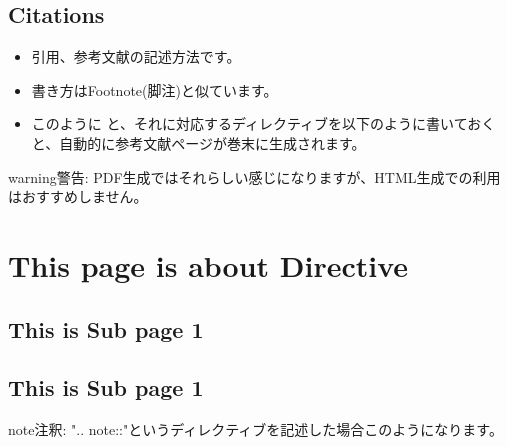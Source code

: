 \documentclass[letterpaper,10pt,dvipdfmx,openany,oneside]{sphinxmanual}
\begin{document}
\section{Citations}
\label{\detokenize{1.chapter/basic_syntax:citations}}\begin{itemize}
\item {} 
引用、参考文献の記述方法です。

\item {} 
書き方はFootnote(脚注)と似ています。

\item {} 
このように \label{\detokenize{1.chapter/basic_syntax:id5}}{\hyperref[\detokenize{1.chapter/basic_syntax:abc}]{\sphinxcrossref{{[}参考文献名ABC{]}}}} と、それに対応するディレクティブを以下のように書いておくと、自動的に参考文献ページが巻末に生成されます。

\end{itemize}

%
\begin{sphinxVerbatim}[commandchars=\\\{\}]
 \PYG{p}{[}\PYG{p}{]}   
\end{sphinxVerbatim}

\begin{sphinxadmonition}{warning}{警告:}
PDF生成ではそれらしい感じになりますが、HTML生成での利用はおすすめしません。
\end{sphinxadmonition}


\chapter{This page is about Directive}
\label{\detokenize{2.chapter/directive::doc}}\label{\detokenize{2.chapter/directive:this-page-is-about-directive}}

\section{This is Sub page 1}
\label{\detokenize{2.chapter/subpage/sub1:this-is-sub-page-1}}\label{\detokenize{2.chapter/subpage/sub1::doc}}

\section{This is Sub page 1}
\label{\detokenize{2.chapter/subpage/sub2:this-is-sub-page-1}}\label{\detokenize{2.chapter/subpage/sub2::doc}}
\begin{sphinxadmonition}{note}{注釈:}
".. note::"というディレクティブを記述した場合このようになります。
\end{sphinxadmonition}
\end{document}
